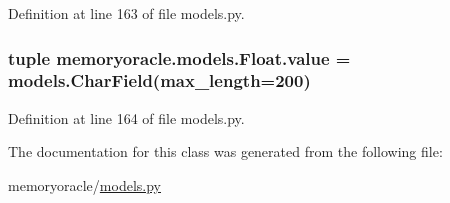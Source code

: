 Definition at line 163 of file models.\+py.

\hypertarget{classmemoryoracle_1_1models_1_1Float_a822e38f5c09e6dc2819d293b83a20df6}{}
\subsubsection[{value}]{\setlength{\rightskip}{0pt plus 5cm}tuple memoryoracle.\+models.\+Float.\+value = models.\+Char\+Field(max\+\_\+length=200)\hspace{0.3cm}{\ttfamily [static]}}\label{classmemoryoracle_1_1models_1_1Float_a822e38f5c09e6dc2819d293b83a20df6}


Definition at line 164 of file models.\+py.



The documentation for this class was generated from the following file\+:\begin{DoxyCompactItemize}
\item 
memoryoracle/\hyperlink{models_8py}{models.\+py}\end{DoxyCompactItemize}
